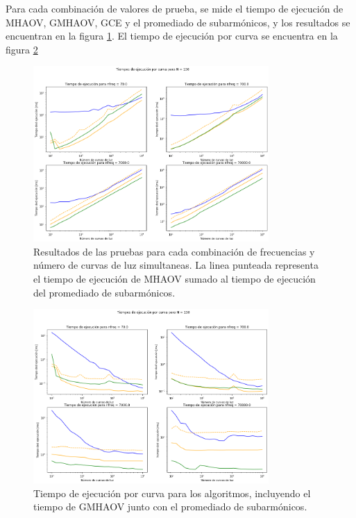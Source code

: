Para cada combinación de valores de prueba, se mide el tiempo de ejecución de MHAOV, GMHAOV, GCE y el promediado de subarmónicos, y los resultados se encuentran en la figura \ref{fig:benchmarks}. El tiempo de ejecución por curva se encuentra en la figura \ref{fig:benchmark-por-curva}
\begin{figure}[h]

    \centering
    \includegraphics[width=0.8\textwidth]{figs/benchmarks-total.png}
    \caption{Resultados de las pruebas para cada combinación de frecuencias y número de curvas de luz simultaneas. La linea punteada representa el tiempo de ejecución de MHAOV sumado al tiempo de ejecución del promediado de subarmónicos.}
    \label{fig:benchmarks}
\end{figure}

\begin{figure}[h]
    \centering
    \includegraphics[width=0.8\textwidth]{figs/benchmarks.png}
    \caption{Tiempo de ejecución por curva para los algoritmos, incluyendo el tiempo de GMHAOV junto con el promediado de subarmónicos.}
    \label{fig:benchmark-por-curva}
\end{figure}

